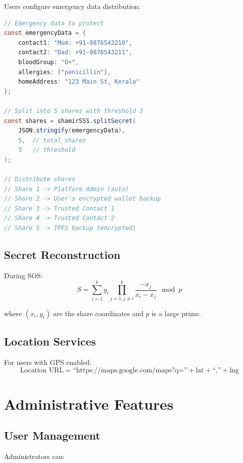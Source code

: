 \documentclass[12pt]{report}
\theoremstyle{plain}
\theoremstyle{definition}
\theoremstyle{remark}
\begin{document}
Users configure emergency data distribution:

\begin{lstlisting}[language=Java, caption=Shamir's Secret Sharing Setup]
// Emergency data to protect
const emergencyData = {
    contact1: "Mom: +91-9876543210",
    contact2: "Dad: +91-9876543211",
    bloodGroup: "O+",
    allergies: ["penicillin"],
    homeAddress: "123 Main St, Kerala"
};

// Split into 5 shares with threshold 3
const shares = shamirSSS.splitSecret(
    JSON.stringify(emergencyData),
    5,  // total shares
    3   // threshold
);

// Distribute shares
// Share 1 -> Platform Admin (auto)
// Share 2 -> User's encrypted wallet backup
// Share 3 -> Trusted Contact 1
// Share 4 -> Trusted Contact 2
// Share 5 -> IPFS backup (encrypted)
\end{lstlisting}

\subsection{Secret Reconstruction}

During SOS:
\begin{equation}
S = \sum_{i=1}^{k} y_i \prod_{j=1, j \neq i}^{k} \frac{-x_j}{x_i - x_j} \mod p
\end{equation}

where $(x_i, y_i)$ are the share coordinates and $p$ is a large prime.

\subsection{Location Services}

For users with GPS enabled:
\begin{equation}
\text{Location URL} = \text{``https://maps.google.com/maps?q=''} + \text{lat} + \text{``,''} + \text{lng}
\end{equation}

\section{Administrative Features}

\subsection{User Management}

Administrators can:
\end{document}
